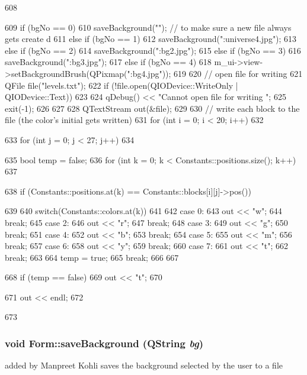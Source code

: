 \begin{DoxyCode}
608 {
609     if (bgNo == 0)
610         saveBackground("");         // to make sure a new file always gets create
      d
611     else if (bgNo == 1)
612         saveBackground(":universe4.jpg");
613     else if (bgNo == 2)
614         saveBackground(":bg2.jpg");
615     else if (bgNo == 3)
616         saveBackground(":bg3.jpg");
617     else if (bgNo == 4)
618         m_ui->view->setBackgroundBrush(QPixmap(":bg4.jpg"));
619 
620     // open file for writing
621     QFile file("levels.txt");
622     if (!file.open(QIODevice::WriteOnly | QIODevice::Text))
623     {
624         qDebug() << "Cannot open file for writing ";
625         exit(-1);
626     }
627 
628     QTextStream out(&file);
629 
630     // write each block to the file (the color's initial gets written)
631     for (int i = 0; i < 20; i++)
632     {
633         for (int j = 0; j < 27; j++)
634         {
635             bool temp = false;
636             for (int k = 0; k < Constants::positions.size(); k++)
637             {
638                 if (Constants::positions.at(k) == Constants::blocks[i][j]->pos())
      
639                 {
640                     switch(Constants::colors.at(k))
641                     {
642                         case 0:
643                             out << "w";
644                             break;
645                         case 2:
646                             out << "r";
647                             break;
648                         case 3:
649                             out << "g";
650                             break;
651                         case 4:
652                             out << "b";
653                             break;
654                         case 5:
655                             out << "m";
656                             break;
657                         case 6:
658                             out << "y";
659                             break;
660                         case 7:
661                             out << "t";
662                             break;
663                     }
664                     temp = true;
665                     break;
666                 }
667             }
668             if (temp == false)
669                 out << "t";
670         }
671         out << endl;
672     }
673 }
\end{DoxyCode}
\hypertarget{class_form_ae852329bf7940d71cf722e412f40b867}{
\subsubsection[{saveBackground}]{\setlength{\rightskip}{0pt plus 5cm}void Form::saveBackground (QString {\em bg})}}
\label{class_form_ae852329bf7940d71cf722e412f40b867}
added by Manpreet Kohli saves the background selected by the user to a file 

